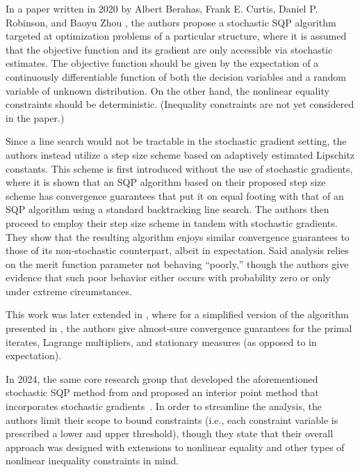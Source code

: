 \documentclass[12pt]{article}
\newcommand{\1}{\scalebox{1.06}{\ensuremath{\mathrel{\mathmybb{1}}}}}
\theoremstyle{definition}
\begin{document}
In a paper written in 2020 by Albert Berahas, Frank E. Curtis, Daniel P. Robinson, and Baoyu Zhou \cite{stochasticSQP}, the authors propose a stochastic SQP algorithm targeted at optimization problems of a particular structure,
where it is assumed that the objective function and its gradient are only accessible via stochastic estimates.
The objective function should be given by the expectation of a continuously differentiable function of both the decision variables and a random variable of unknown distribution. On the other hand, the nonlinear equality constraints should be deterministic. (Inequality constraints are not yet considered in the paper.)

Since a line search would not be tractable in the stochastic gradient setting, the authors instead utilize a step size scheme based on adaptively estimated Lipschitz constants. This scheme is first introduced without the use of stochastic gradients, where it is shown that an SQP algorithm based on their proposed step size scheme has convergence guarantees that put it on equal footing with that of an SQP algorithm using a standard backtracking line search.
The authors then proceed to employ their step size scheme in tandem with stochastic gradients. They show that the resulting algorithm enjoys similar convergence guarantees to those of its non-stochastic counterpart, albeit in expectation.
Said analysis relies on the merit function parameter not behaving ``poorly,'' though the authors give evidence that such poor behavior either occurs with probability zero or only under extreme circumstances.

This work was later extended in \cite{almostSurely}, where for a simplified version of the algorithm presented in \cite{stochasticSQP}, the authors give almost-sure convergence guarantees for the primal iterates, Lagrange multipliers, and stationary measures (as opposed to in expectation).
\newline

In 2024, the
same core research group that developed the aforementioned stochastic SQP method from \cite{stochasticSQP} and \cite{almostSurely} proposed an interior point method that incorporates stochastic gradients~\cite{interiorPoint}.
In order to streamline the analysis, the authors limit their scope to bound constraints (i.e., each constraint variable is prescribed a lower and upper threshold), though they state that their overall approach was designed with extensions to nonlinear equality and other types of nonlinear inequality constraints in mind.
\end{document}
